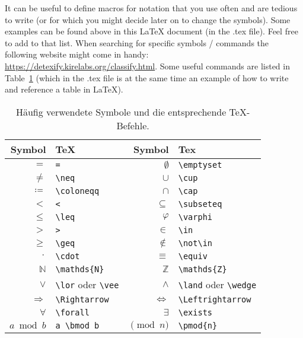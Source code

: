 \documentclass[a4paper,11pt]{article}
\theoremstyle{definition}
\begin{document}
It can be useful to define macros for notation that you use often and are tedious to write (or for which you might decide later on to change the symbols). Some examples can be found above in this \LaTeX{} document (in the .tex file). Feel free to add to that list.  When searching for specific symbols / commands the following website might come in handy: \url{https://detexify.kirelabs.org/classify.html}. Some useful commands are listed in Table~\ref{tab:symbols} (which in the .tex file is at the same time an example of how to write and reference a table in \LaTeX{}).
\begin{table}[t]
	\centering
	\begin{tabular}[t]{rlrl}
		\toprule
		Symbol & TeX & Symbol & Tex\\
		\midrule
		$=$             & \verb|=|              & $\emptyset$       & \verb|\emptyset|\\
		$\neq$          & \verb|\neq|           & $\cup$            & \verb|\cup|\\
		$\coloneqq$     & \verb|\coloneqq|      & $\cap$            & \verb|\cap|\\
		$<$             & \verb|<|              & $\subseteq$       & \verb|\subseteq|\\
		$\leq$          & \verb|\leq|           & $\varphi$         & \verb|\varphi|\\ 	   
		$>$             & \verb|>|              & $\in$             & \verb|\in|\\
		$\geq$          & \verb|\geq|           & $\not\in$         & \verb|\not\in|\\
		${}\cdot{}$     & \verb|\cdot|          & $\equiv$          & \verb|\equiv|\\
		$\mathds{N}$    & \verb|\mathds{N}|     & $\mathds{Z}$      & \verb|\mathds{Z}|\\
		$\lor$          & \verb|\lor| oder \verb|\vee|& $\land$& \verb|\land| oder \verb|\wedge|\\
		$\Rightarrow$   & \verb|\Rightarrow|    & $\Leftrightarrow$ & \verb|\Leftrightarrow|\\
		$\forall$       & \verb|\forall|        & $\exists$         & \verb|\exists|\\
		$a \bmod b$     & \verb|a \bmod b|      & $\pmod{n}$        & \verb|\pmod{n}|\\
		\bottomrule
	\end{tabular}
	\caption{Häufig verwendete Symbole und die entsprechende TeX-Befehle.}
	\label{tab:symbols}
\end{table}
\end{document}
